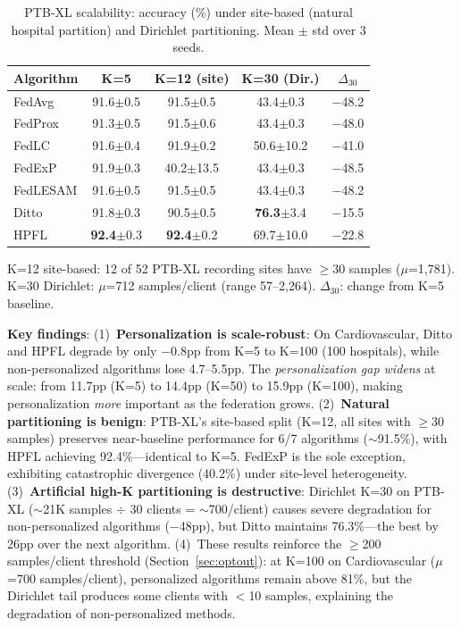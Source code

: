 \documentclass[conference,a4paper]{IEEEtran}
\begin{document}
\begin{table}[htbp]
\centering
\caption{PTB-XL scalability: accuracy (\%) under site-based (natural hospital partition) and Dirichlet partitioning. Mean $\pm$ std over 3 seeds.}
\label{tab:px_scalability}
\small
\begin{tabular}{lcccc}
\toprule
\textbf{Algorithm} & \textbf{K=5} & \textbf{K=12 (site)} & \textbf{K=30 (Dir.)} & \textbf{$\Delta_{30}$} \\
\midrule
FedAvg & 91.6{\tiny$\pm$0.5} & 91.5{\tiny$\pm$0.5} & 43.4{\tiny$\pm$0.3} & $-$48.2 \\
FedProx & 91.3{\tiny$\pm$0.5} & 91.5{\tiny$\pm$0.6} & 43.4{\tiny$\pm$0.3} & $-$48.0 \\
FedLC & 91.6{\tiny$\pm$0.4} & 91.9{\tiny$\pm$0.2} & 50.6{\tiny$\pm$10.2} & $-$41.0 \\
FedExP & 91.9{\tiny$\pm$0.3} & 40.2{\tiny$\pm$13.5} & 43.4{\tiny$\pm$0.3} & $-$48.5 \\
FedLESAM & 91.6{\tiny$\pm$0.5} & 91.5{\tiny$\pm$0.5} & 43.4{\tiny$\pm$0.3} & $-$48.2 \\
\midrule
Ditto & 91.8{\tiny$\pm$0.3} & 90.5{\tiny$\pm$0.5} & \textbf{76.3}{\tiny$\pm$3.4} & $-$15.5 \\
HPFL & \textbf{92.4}{\tiny$\pm$0.3} & \textbf{92.4}{\tiny$\pm$0.2} & 69.7{\tiny$\pm$10.0} & $-$22.8 \\
\bottomrule
\end{tabular}

\vspace{1mm}
\footnotesize{K=12 site-based: 12 of 52 PTB-XL recording sites have $\geq$30 samples ($\mu$=1,781). K=30 Dirichlet: $\mu$=712 samples/client (range 57--2,264). $\Delta_{30}$: change from K=5 baseline.}
\end{table}

\textbf{Key findings}: (1)~\textbf{Personalization is scale-robust}: On Cardiovascular, Ditto and HPFL degrade by only $-$0.8pp from K=5 to K=100 (100 hospitals), while non-personalized algorithms lose 4.7--5.5pp. The \textit{personalization gap widens} at scale: from 11.7pp (K=5) to 14.4pp (K=50) to 15.9pp (K=100), making personalization \textit{more} important as the federation grows.
(2)~\textbf{Natural partitioning is benign}: PTB-XL's site-based split (K=12, all sites with $\geq$30 samples) preserves near-baseline performance for 6/7 algorithms ($\sim$91.5\%), with HPFL achieving 92.4\%---identical to K=5. FedExP is the sole exception, exhibiting catastrophic divergence (40.2\%) under site-level heterogeneity.
(3)~\textbf{Artificial high-K partitioning is destructive}: Dirichlet K=30 on PTB-XL ($\sim$21K samples $\div$ 30 clients = $\sim$700/client) causes severe degradation for non-personalized algorithms ($-$48pp), but Ditto maintains 76.3\%---the best by 26pp over the next algorithm.
(4)~These results reinforce the $\geq$200 samples/client threshold (Section~\ref{sec:optout}): at K=100 on Cardiovascular ($\mu$=700 samples/client), personalized algorithms remain above 81\%, but the Dirichlet tail produces some clients with $<$10 samples, explaining the degradation of non-personalized methods.
\end{document}
